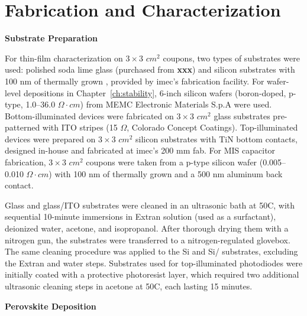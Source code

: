 \chapter{Fabrication and Characterization}\label{ch:appendixA}

\textbf{Substrate Preparation}

For thin-film characterization on $3 \times 3$ $cm^2$ coupons, two types of substrates were used: polished soda lime glass (purchased from \textbf{xxx}) and silicon substrates with 100 nm of thermally grown , provided by imec's fabrication facility. For wafer-level depositions in Chapter~\ref{ch:stability}, 6-inch silicon wafers (boron-doped, p-type, 1.0–36.0 $\Omega\cdot cm$) from MEMC Electronic Materials S.p.A were used. Bottom-illuminated devices were fabricated on $3 \times 3$ $cm^2$ glass substrates pre-patterned with ITO stripes (15 $\Omega$, Colorado Concept Coatings). Top-illuminated devices were prepared on $3 \times 3$ $cm^2$ silicon substrates with TiN bottom contacts, designed in-house and fabricated at imec's 200 mm fab. For MIS capacitor fabrication, $3 \times 3$ $cm^2$ coupons were taken from a p-type silicon wafer (0.005–0.010 $\Omega\cdot cm$) with 100 nm of thermally grown  and a 500 nm aluminum back contact.

Glass and glass/ITO substrates were cleaned in an ultrasonic bath at 50\degree C, with sequential 10-minute immersions in Extran solution (used as a surfactant), deionized water, acetone, and isopropanol. After thorough drying them with a nitrogen gun, the substrates were transferred to a nitrogen-regulated glovebox. The same cleaning procedure was applied to the Si and Si/ substrates, excluding the Extran and water steps. Substrates used for top-illuminated photodiodes were initially coated with a protective photoresist layer, which required two additional ultrasonic cleaning steps in acetone at 50\degree C, each lasting 15 minutes.


\textbf{Perovskite Deposition}

